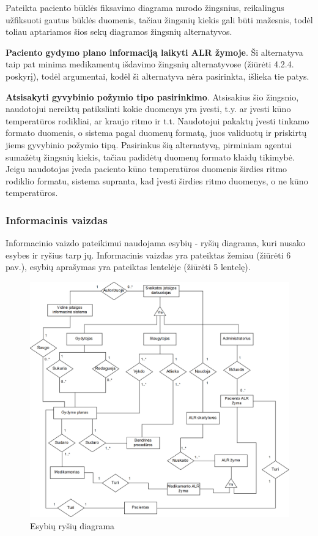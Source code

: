 Pateikta paciento būklės fiksavimo diagrama nurodo žingsnius, reikalingus užfiksuoti gautus būklės duomenis, tačiau žingsnių kiekis gali būti mažesnis, todėl toliau aptariamos šios sekų diagramos žingsnių alternatyvos.

\textbf{Paciento gydymo plano informaciją laikyti ALR žymoje}. Ši alternatyva taip pat minima medikamentų išdavimo žingsnių alternatyvose (žiūrėti 4.2.4. poskyrį), todėl argumentai, kodėl ši alternatyva nėra pasirinkta, išlieka tie patys.

\textbf{Atsisakyti gyvybinio požymio tipo pasirinkimo}. Atsisakius šio žingsnio, naudotojui nereiktų patikslinti kokie duomenys yra įvesti, t.y. ar įvesti kūno temperatūros rodikliai, ar kraujo ritmo ir t.t. Naudotojui pakaktų įvesti tinkamo formato duomenis, o sistema pagal duomenų formatą, juos validuotų ir priskirtų jiems gyvybinio požymio tipą. Pasirinkus šią alternatyvą, pirminiam agentui sumažėtų žingsnių kiekis, tačiau padidėtų duomenų formato klaidų tikimybė. Jeigu naudotojas įveda paciento kūno temperatūros duomenis širdies ritmo rodiklio formatu, sistema supranta, kad įvesti širdies ritmo duomenys, o ne kūno temperatūros.

\subsubsection{Informacinis vaizdas}
Informacinio vaizdo pateikimui naudojama esybių - ryšių diagrama, kuri nusako esybes ir ryšius tarp jų. Informacinis vaizdas yra pateiktas žemiau (žiūrėti 6 pav.), esybių aprašymas yra pateiktas lentelėje (žiūrėti 5 lentelę).

\begin{figure}[H]
    \centering
    \includegraphics[scale=0.27]{images/erDiagrama}
    \caption{Esybių ryšių diagrama}
\end{figure}

